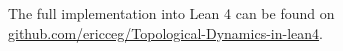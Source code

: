\documentclass[11pt]{article}
\theoremstyle{definition}              %
\theoremstyle{definition}              %
\theoremstyle{definition}              %
\begin{document}
The full implementation into Lean 4 can be found on \href{https://github.com/ericceg/Topological-Dynamics-in-lean4/blob/master/Project/Corollary.lean}{github.com/ericceg/Topological-Dynamics-in-lean4}.




\newpage





\begin{comment}
\begin{thebibliography}{999}

\bibitem[Ceglie, 2024]{ceglie}
Ceglie, Eric (2024).
\textit{Dynamical Systems and Ergodic Theory Lecture Notes}

\bibitem[Kudryashov, 2021]{kudry}
Kudryashov, Yury (2021).
\textit{Minimal.lean: Mathlib 4, Dynamics, Topological Entropy, \href{https://github.com/leanprover-community/mathlib4/blob/master/Mathlib/Dynamics/Minimal.lean}{https://github.com/Minimal.lean}, accessed 2025-05-06}


\end{thebibliography}
\end{comment}
\end{document}
